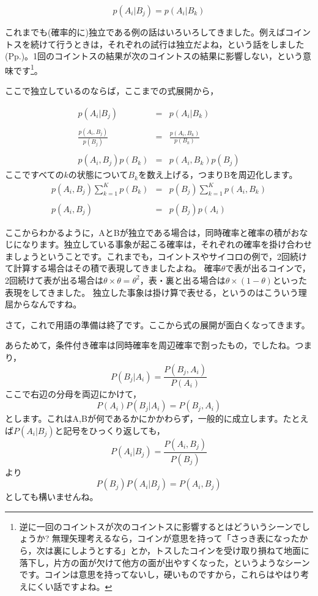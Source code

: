 \documentclass{ltjbook}
\begin{document}
\[ p(A_i| B_j) = p(A_i|B_k) \]

これまでも(確率的に)独立である例の話はいろいろしてきました。例えばコイントスを続けて行うときは，それぞれの試行は独立だよね，という話をしました(Pp.\pageref{iidexample})。1回のコイントスの結果が次のコイントスの結果に影響しない，という意味です\footnote{逆に一回のコイントスが次のコイントスに影響するとはどういうシーンでしょうか? 無理矢理考えるなら，コインが意思を持って「さっき表になったから，次は裏にしようとする」とか，トスしたコインを受け取り損ねて地面に落下し，片方の面が欠けて他方の面が出やすくなった，というようなシーンです。コインは意思を持ってないし，硬いものですから，これらはやはり考えにくい話ですよね。}。

ここで独立しているのならば，ここまでの式展開から，

\begin{equation}
    \begin{array}{lll}
        p(A_i| B_j) &=& p(A_i|B_k) \\
        &&\\
        \frac{p(A_i,B_j)}{p(B_j)} &=& \frac{p(A_i,B_k)}{p(B_k)}\\
        &&\\
        p(A_i,B_j)p(B_k) &=& p(A_i,B_k)p(B_j) 
    \end{array}
\end{equation}
ここですべての$k$の状態について$B_k$を数え上げる，つまりBを周辺化します。
\begin{equation}
    \begin{array}{lll}
        p(A_i,B_j)\sum_{k=1}^K p(B_k) &=& p(B_j)\sum_{k=1}^K p(A_i,B_k) \\
        &&\\
        p(A_i,B_j) &=& p(B_j)p(A_i)
    \end{array}
\end{equation}

ここからわかるように，AとBが独立である場合は，同時確率と確率の積がおなじになります。独立している事象が起こる確率は，それぞれの確率を掛け合わせましょうということです。これまでも，コイントスやサイコロの例で，2回続けて計算する場合はその積で表現してきましたよね。
確率$\theta$で表が出るコインで，2回続けて表が出る場合は$\theta \times \theta=\theta^2$，表・裏と出る場合は$\theta \times (1-\theta)$といった表現をしてきました。
独立した事象は掛け算で表せる，というのはこういう理屈からなんですね。


さて，これで用語の準備は終了です。ここから式の展開が面白くなってきます。

あらためて，条件付き確率は同時確率を周辺確率で割ったもの，でしたね。つまり，
\[ P(B_j | A_i) = \frac{P(B_j,A_i)}{P(A_i)} \]
ここで右辺の分母を両辺にかけて，
\[ P(A_i)P(B_j|A_i) = P(B_j,A_i) \]
とします。これはA,Bが何であるかにかかわらず，一般的に成立します。たとえば$P(A_i|B_j)$と記号をひっくり返しても，
\[ P(A_i|B_j) = \frac{P(A_i,B_j)}{P(B_j)} \]
より
\[P(B_j)P(A_i|B_j) = P(A_i,B_j) \]
としても構いませんね。
\end{document}
